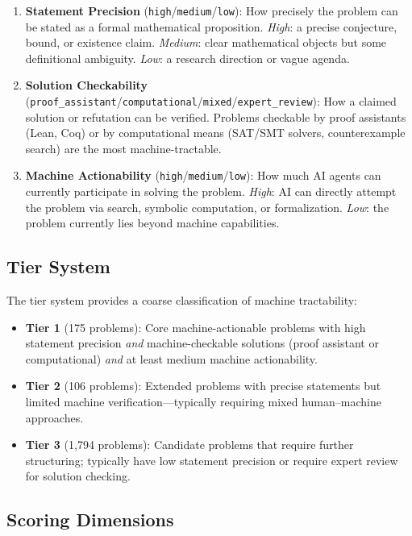 \documentclass[11pt]{article}
\begin{document}
\begin{enumerate}  \item \textbf{Statement Precision} (\texttt{high}/\texttt{medium}/\texttt{low}): How precisely the problem can be stated as a formal mathematical proposition. \emph{High}: a precise conjecture, bound, or existence claim. \emph{Medium}: clear mathematical objects but some definitional ambiguity. \emph{Low}: a research direction or vague agenda.
  \item \textbf{Solution Checkability} (\texttt{proof\_assistant}/\texttt{computational}/\texttt{mixed}/\texttt{expert\_review}): How a claimed solution or refutation can be verified. Problems checkable by proof assistants (Lean, Coq) or by computational means (SAT/SMT solvers, counterexample search) are the most machine-tractable.
  \item \textbf{Machine Actionability} (\texttt{high}/\texttt{medium}/\texttt{low}): How much AI agents can currently participate in solving the problem. \emph{High}: AI can directly attempt the problem via search, symbolic computation, or formalization. \emph{Low}: the problem currently lies beyond machine capabilities.
\end{enumerate}

\subsection{Tier System}

The tier system provides a coarse classification of machine tractability:

\begin{itemize}  \item \textbf{Tier 1} (175 problems): Core machine-actionable problems with high statement precision \emph{and} machine-checkable solutions (proof assistant or computational) \emph{and} at least medium machine actionability.
  \item \textbf{Tier 2} (106 problems): Extended problems with precise statements but limited machine verification---typically requiring mixed human--machine approaches.
  \item \textbf{Tier 3} (1{,}794 problems): Candidate problems that require further structuring; typically have low statement precision or require expert review for solution checking.
\end{itemize}

\subsection{Scoring Dimensions}
\end{document}
